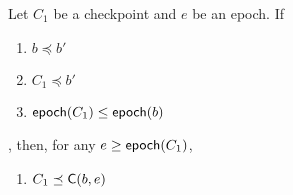 
\begin{property}\label{prop:on-chkp-prec}
    Let $C_1$ be a checkpoint and $e$ be an epoch.
    If
    \begin{enumerate}
        \item $b \preceq b'$
        \item $C_1 \preceq b'$
        \item $\mathsf{epoch}(C_1) \leq \mathsf{epoch}(b)$
    \end{enumerate}, 
    then, for any $e \geq \mathsf{epoch}(C_1)$,
    \begin{enumerate}
        \item $C_1 \preceq \mathsf{C}(b,e)$
    \end{enumerate}
\end{property}

